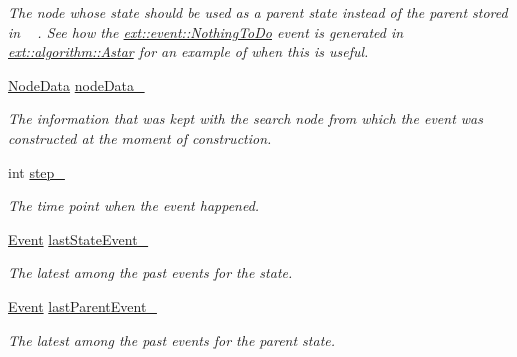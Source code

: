 \begin{DoxyCompactItemize}
\begin{DoxyCompactList}\small\item\em The node whose state should be used as a parent state instead of the parent stored in ~\newline
. See how the \hyperlink{structslb_1_1ext_1_1event_1_1NothingToDo}{ext\+::event\+::\+Nothing\+To\+Do} event is generated in \hyperlink{structslb_1_1ext_1_1algorithm_1_1Astar}{ext\+::algorithm\+::\+Astar} for an example of when this is useful. \end{DoxyCompactList}\item 
\hyperlink{structslb_1_1core_1_1ui_1_1EventBase_a1eefdf6331e2af79cd1ba37eff880a18}{Node\+Data} \hyperlink{structslb_1_1core_1_1ui_1_1EventBase_af94e406ffc21c85314b3ef4379ed40da}{node\+Data\+\_\+}\hypertarget{structslb_1_1core_1_1ui_1_1EventBase_af94e406ffc21c85314b3ef4379ed40da}{}\label{structslb_1_1core_1_1ui_1_1EventBase_af94e406ffc21c85314b3ef4379ed40da}

\begin{DoxyCompactList}\small\item\em The information that was kept with the search node from which the event was constructed at the moment of construction. \end{DoxyCompactList}\item 
int \hyperlink{structslb_1_1core_1_1ui_1_1EventBase_a8a22e5faef2804761d29accd8174d4f9}{step\+\_\+}\hypertarget{structslb_1_1core_1_1ui_1_1EventBase_a8a22e5faef2804761d29accd8174d4f9}{}\label{structslb_1_1core_1_1ui_1_1EventBase_a8a22e5faef2804761d29accd8174d4f9}

\begin{DoxyCompactList}\small\item\em The time point when the event happened. \end{DoxyCompactList}\item 
\hyperlink{structslb_1_1core_1_1ui_1_1EventBase_a7b61ed0ba0f2fdeb854c631188725d37}{Event} \hyperlink{structslb_1_1core_1_1ui_1_1EventBase_a54f145d471419194b65eaa0de024d7ac}{last\+State\+Event\+\_\+}\hypertarget{structslb_1_1core_1_1ui_1_1EventBase_a54f145d471419194b65eaa0de024d7ac}{}\label{structslb_1_1core_1_1ui_1_1EventBase_a54f145d471419194b65eaa0de024d7ac}

\begin{DoxyCompactList}\small\item\em The latest among the past events for the state. \end{DoxyCompactList}\item 
\hyperlink{structslb_1_1core_1_1ui_1_1EventBase_a7b61ed0ba0f2fdeb854c631188725d37}{Event} \hyperlink{structslb_1_1core_1_1ui_1_1EventBase_af19c67b003d90e40b84b8bed395a3662}{last\+Parent\+Event\+\_\+}\hypertarget{structslb_1_1core_1_1ui_1_1EventBase_af19c67b003d90e40b84b8bed395a3662}{}\label{structslb_1_1core_1_1ui_1_1EventBase_af19c67b003d90e40b84b8bed395a3662}

\begin{DoxyCompactList}\small\item\em The latest among the past events for the parent state. \end{DoxyCompactList}\end{DoxyCompactItemize}
